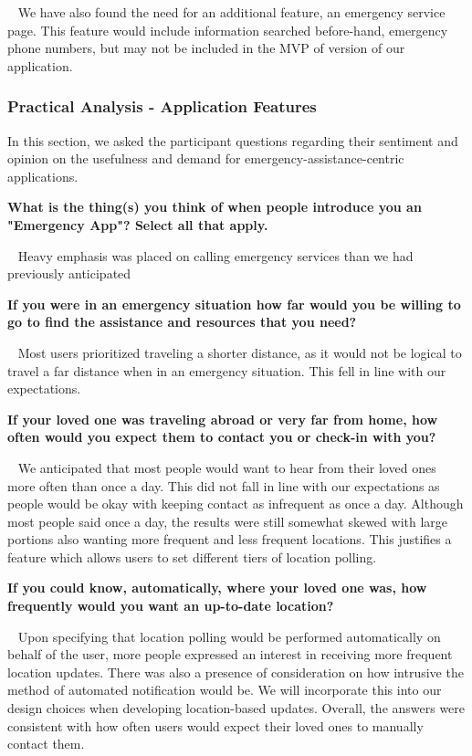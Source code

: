 \documentclass{scrreprt}
\begin{document}
\par ~ We have also found the need for an additional feature, an emergency service page. This feature would include information searched before-hand, emergency phone numbers, but may not be included in the MVP of version of our application.

\subsubsection{Practical Analysis - Application Features}
In this section, we asked the participant questions regarding their sentiment and opinion on the usefulness and demand for emergency-assistance-centric applications.

\textbf{What is the thing(s) you think of when people introduce you an "Emergency App"? Select all that apply.}
\par ~ Heavy emphasis was placed on calling emergency services than we had previously anticipated

\textbf{If you were in an emergency situation how far would you be willing to go to find the assistance and resources that you need?}
\par ~ Most users prioritized traveling a shorter distance, as it would not be logical to travel a far distance when in an emergency situation. This fell in line with our expectations.

\textbf{If your loved one was traveling abroad or very far from home, how often would you expect them to contact you or check-in with you?}
\par ~ We anticipated that most people would want to hear from their loved ones more often than once a day. This did not fall in line with our expectations as people would be okay with keeping contact as infrequent as once a day. Although most people said once a day, the results were still somewhat skewed with large portions also wanting more frequent and less frequent locations. This justifies a feature which allows users to set different tiers of location polling.


\textbf{If you could know, automatically, where your loved one was, how frequently would you want an up-to-date location?}
\par ~ Upon specifying that location polling would be performed automatically on behalf of the user, more people expressed an interest in receiving more frequent location updates. There was also a presence of consideration on how intrusive the method of automated notification would be. We will incorporate this into our design choices when developing location-based updates. Overall, the answers were consistent with how often users would expect their loved ones to manually contact them. 
\end{document}
